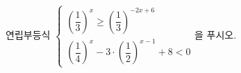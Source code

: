 연립부등식 $\begin{cases} \left(\dfrac{1}{3}\right)^{x}\ge\left(\dfrac{1}{3}\right)^{-2x+6} \\ \left(\dfrac{1}{4}\right)^{x}-3\cdot\left(\dfrac{1}{2}\right)^{x-1}+8<0 \end{cases}$을 푸시오.

